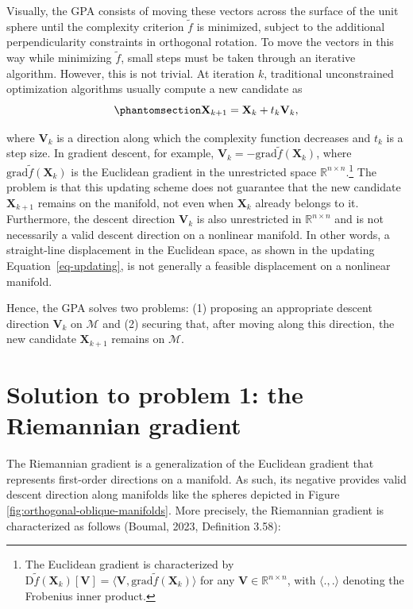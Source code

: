 \documentclass[
  12pt,
  letterpaper,
  article]{scrartcl}
\begin{document}
Visually, the GPA consists of moving these vectors across the surface of
the unit sphere until the complexity criterion \(\tilde{f}\) is
minimized, subject to the additional perpendicularity constraints in
orthogonal rotation. To move the vectors in this way while minimizing
\(\tilde{f}\), small steps must be taken through an iterative algorithm.
However, this is not trivial. At iteration \(k\), traditional
unconstrained optimization algorithms usually compute a new candidate as
\begin{equation}\protect\phantomsection\label{eq-updating}{
\mathbf{X}_{k+1} = \mathbf{X}_k + t_k\mathbf{V}_k,
}\end{equation}

where \(\mathbf{V}_k\) is a direction along which the complexity
function decreases and \(t_k\) is a step size. In gradient descent, for
example, \(\mathbf{V}_k = -\text{grad}\tilde{f}(\mathbf{X}_k)\), where
\(\text{grad}\tilde{f}(\mathbf{X}_k)\) is the Euclidean gradient in the
unrestricted space \(\mathbb{R}^{n\times n}\).\footnote{The Euclidean
  gradient is characterized by
  \(\mathrm{D}\tilde{f}(\mathbf{X}_k)[\mathbf{V}] = \langle \mathbf{V},\text{grad}\tilde{f}(\mathbf{X}_k)\rangle\)
  for any \(\mathbf{V}\in\mathbb{R}^{n\times n}\), with
  \(\langle ., . \rangle\) denoting the Frobenius inner product.} The
problem is that this updating scheme does not guarantee that the new
candidate \(\mathbf{X}_{k+1}\) remains on the manifold, not even when
\(\mathbf{X}_k\) already belongs to it. Furthermore, the descent
direction \(\mathbf{V}_k\) is also unrestricted in
\(\mathbb{R}^{n\times n}\) and is not necessarily a valid descent
direction on a nonlinear manifold. In other words, a straight-line
displacement in the Euclidean space, as shown in the updating
Equation~\ref{eq-updating}, is not generally a feasible displacement on
a nonlinear manifold.

Hence, the GPA solves two problems: (1) proposing an appropriate descent
direction \(\mathbf{V}_k\) on \(\mathcal{M}\) and (2) securing that,
after moving along this direction, the new candidate
\(\mathbf{X}_{k+1}\) remains on \(\mathcal{M}\).

\section{Solution to problem 1: the Riemannian
gradient}\label{solution-to-problem-1-the-riemannian-gradient}

The Riemannian gradient is a generalization of the Euclidean gradient
that represents first-order directions on a manifold. As such, its
negative provides valid descent direction along manifolds like the
spheres depicted in Figure \ref{fig:orthogonal-oblique-manifolds}. More
precisely, the Riemannian gradient is characterized as follows (Boumal,
2023, Definition 3.58):
\end{document}
